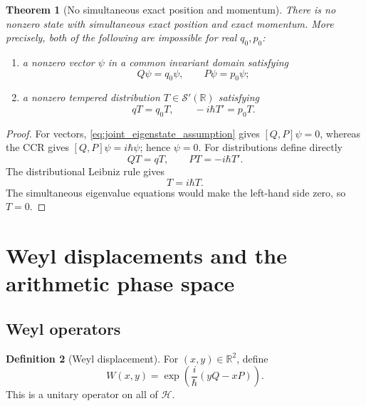 \documentclass[11pt]{amsart}
\numberwithin{equation}{section}
\theoremstyle{plain}
\newtheorem{theorem}{Theorem}[section]
\theoremstyle{definition}
\newtheorem{definition}[theorem]{Definition}
\theoremstyle{remark}
\newcommand{\R}{\mathbb{R}}
\newcommand{\Hil}{\mathcal{H}}
\newcommand{\Sch}{\mathcal{S}}
\begin{document}
\begin{theorem}[No simultaneous exact position and momentum]
\label{thm:no_joint_eigenstate}
There is no nonzero state with simultaneous exact position and exact momentum.
More precisely, both of the following are impossible for real \(q_0,p_0\):
\begin{enumerate}[leftmargin=*]
\item a nonzero vector \(\psi\) in a common invariant domain satisfying
\begin{equation}
Q\psi=q_0\psi,
\qquad
P\psi=p_0\psi;
\label{eq:joint_eigenstate_assumption}
\end{equation}
\item a nonzero tempered distribution \(T\in\Sch'(\R)\) satisfying
\begin{equation}
qT=q_0T,
\qquad
-i\hbar T'=p_0T.
\label{eq:joint_distribution_assumption}
\end{equation}
\end{enumerate}
\end{theorem}

\begin{proof}
For vectors, \eqref{eq:joint_eigenstate_assumption} gives
\([Q,P]\psi=0\), whereas the CCR gives \([Q,P]\psi=i\hbar\psi\); hence
\(\psi=0\).  For distributions define directly
\begin{equation}
QT=qT,
\qquad
PT=-i\hbar T'.
\label{eq:distribution_QP_definition}
\end{equation}
The distributional Leibniz rule gives
\begin{equation}
[Q,P]T=i\hbar T.
\label{eq:distribution_CCR}
\end{equation}
The simultaneous eigenvalue equations would make the left-hand side zero,
so \(T=0\).
\end{proof}

\section{Weyl displacements and the arithmetic phase space}
\label{sec:weyl_arithmetic}

\subsection{Weyl operators}
\label{subsec:weyl_operators}

\begin{definition}[Weyl displacement]
\label{def:weyl_operator}
For $(x,y)\in\R^2$, define
\begin{equation}
W(x,y)
=
\exp\!\left(\frac{i}{\hbar}(yQ-xP)\right).
\label{eq:weyl_definition}
\end{equation}
This is a unitary operator on all of $\Hil$.
\end{definition}
\end{document}
